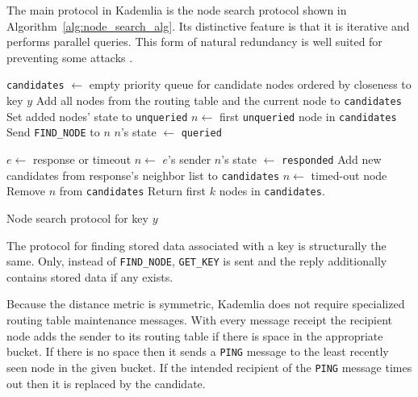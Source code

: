   The main protocol in Kademlia is the node search protocol shown in
  Algorithm~\ref{alg:node_search_alg}. Its distinctive feature is that it is
  iterative and performs parallel queries. This form of natural redundancy is
  well suited for preventing some attacks \cite{sit02}.

  \begin{algorithm}
    \begin{algorithmic}[1]
    \STATE \texttt{candidates} $\leftarrow$ empty priority queue for candidate
    nodes ordered by closeness to key $y$
    \STATE Add all nodes from the routing table and the current node to
    \texttt{candidates}
    \STATE Set added nodes' state to \texttt{unqueried}
        \STATE $n \leftarrow$ first \texttt{unqueried} node in
          \texttt{candidates} 
        \STATE Send \texttt{FIND\_NODE} to $n$
        \STATE $n$'s state $\leftarrow$ \texttt{queried}
    \ENDWHILE
      
    \STATE $e \leftarrow$ response or timeout
      \STATE $n \leftarrow$ $e$'s sender
      \STATE $n$'s state $\leftarrow$ \texttt{responded}
      \STATE Add new candidates from response's neighbor list to
      \texttt{candidates}
    \ELSE
      \STATE $n \leftarrow$ timed-out node
      \STATE Remove $n$ from \texttt{candidates}
    \ENDIF
    \ENDWHILE
    \STATE Return first $k$ nodes in \texttt{candidates}.
  \end{algorithmic}
    \caption{Node search protocol for key $y$}
    \label{alg:node_search_alg}
  \end{algorithm}

  The protocol for finding stored data associated with a key is structurally the
  same.
  Only, instead of \texttt{FIND\_NODE}, \texttt{GET\_KEY} is sent and the reply
  additionally contains stored data if any exists.

  Because the distance metric is symmetric, Kademlia does not require
  specialized routing table maintenance messages.
  With every message receipt the recipient node adds the sender to its routing
  table if there is space in the appropriate bucket.
  If there is no space then it sends a \texttt{PING} message to the least
  recently seen node in the given bucket.
  If the intended recipient of the \texttt{PING} message times out then it is
  replaced by the candidate.

